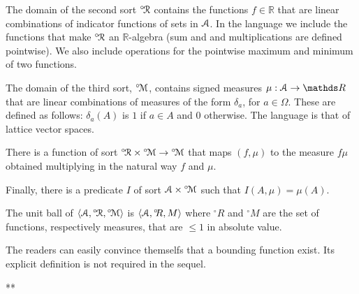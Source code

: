 \documentclass[12pt,letterpaper,oneside,reqno]{amsart}
\theoremstyle{plain}
\theoremstyle{remark}
\begin{document}


The domain of the second sort ${}^{\circ\!}{\EuScript R}$ contains the functions $f\in{\mathds R}$ that are linear combinations of indicator functions of sets in ${\EuScript A}$.
In the language we include the functions that make ${}^{\circ\!}{\EuScript R}$ an ${\mathds R}$-algebra (sum and and multiplications are defined pointwise).
We also include operations for the pointwise maximum and minimum of two functions.

The domain of the third sort, ${}^{\circ\!}{\EuScript M}$, contains signed measures $\mu:{\EuScript A}\to{\mathds R}$ that are linear combinations of measures of the form $\delta_a$, for $a\in\Omega$.
These are defined as follows: $\delta_a(A)$ is $1$ if $a\in A$ and $0$ otherwise.
The language is that of lattice vector spaces.

There is a function of sort ${}^{\circ\!}{\EuScript R}\times{}^{\circ\!}{\EuScript M}\to{}^{\circ\!}{\EuScript M}$ that maps $(f,\mu)$ to the measure $f\mu$ obtained multiplying in the natural way $f$ and $\mu$.

Finally, there is a predicate $I$ of sort ${\EuScript A}\times{}^{\circ\!}{\EuScript M}$ such that $I(A,\mu)=\mu(A)$.

The unit ball of $\langle{\EuScript A},{}^{\circ\!}{\EuScript R},{}^{\circ\!}{\EuScript M}\rangle$ is $\langle{\EuScript A},{}^{\circ\!\!}R,M\rangle$ where ${}^{\circ\!\!}R$ and ${}^{\circ\!\!}M$ are the set of functions, respectively measures, that are $\le1$ in absolute value.

The readers can easily convince themselfs that a bounding function exist.
Its explicit definition is not required in the sequel.

\hfil ***
\end{document}
